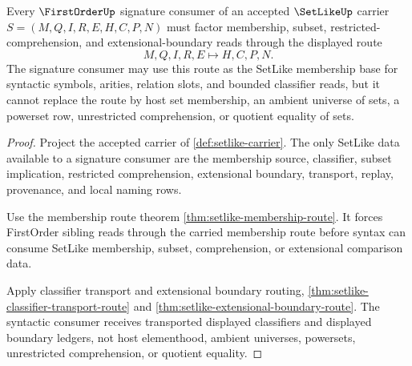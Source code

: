 \begin{theorem}
\label{thm:setlike-root-unblock-firstorder-signature}
Every $\FirstOrderUp$ signature consumer of an accepted $\SetLikeUp$ carrier $S=(M,Q,I,R,E,H,C,P,N)$ must factor membership, subset, restricted-comprehension, and extensional-boundary reads through the displayed route
$$
M,Q,I,R,E \longmapsto H,C,P,N .
$$
The signature consumer may use this route as the SetLike membership base for syntactic symbols, arities, relation slots, and bounded classifier reads, but it cannot replace the route by host set membership, an ambient universe of sets, a powerset row, unrestricted comprehension, or quotient equality of sets.
\end{theorem}
\begin{proof}
Project the accepted carrier of \autoref{def:setlike-carrier}. The only SetLike data available to a signature consumer are the membership source, classifier, subset implication, restricted comprehension, extensional boundary, transport, replay, provenance, and local naming rows.

Use the membership route theorem \autoref{thm:setlike-membership-route}. It forces FirstOrder sibling reads through the carried membership route before syntax can consume SetLike membership, subset, comprehension, or extensional comparison data.

Apply classifier transport and extensional boundary routing, \autoref{thm:setlike-classifier-transport-route} and \autoref{thm:setlike-extensional-boundary-route}. The syntactic consumer receives transported displayed classifiers and displayed boundary ledgers, not host elementhood, ambient universes, powersets, unrestricted comprehension, or quotient equality.
\end{proof}


